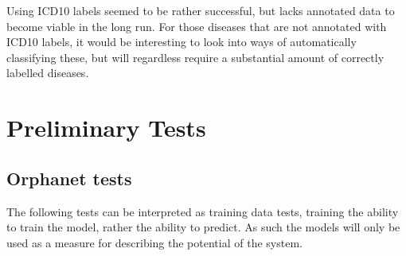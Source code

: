 \documentclass[10pt,letterpaper,final]{article}
\begin{document}
Using ICD10 labels seemed to be rather successful, but lacks annotated
data to become viable in the long run. For those diseases that are not
annotated with ICD10 labels, it would be interesting to look into ways
of automatically classifying these, but will regardless require a
substantial amount of correctly labelled diseases.


\renewcommand\bibname{References}



\newpage
\appendix
\section{Preliminary Tests}
\label{app:preliminary_results}
\subsection{Orphanet tests}
\label{app:orphanet_old_new}
The following tests can be interpreted as training data tests, training
the ability to train the model, rather the ability to predict. As such
the models will only be used as a measure for describing the potential
of the system.
\end{document}
